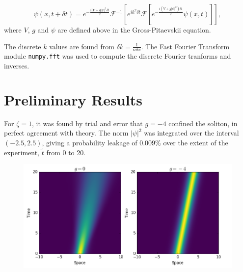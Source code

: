 \documentclass[10pt, twocolumn]{revtex4}    %
\begin{document}
\begin{equation} \label{fft}
\psi(x,t+\delta t) = e^{-\frac{i(V+g|\psi|^2 \delta t}{2}} \mathcal{F}^{-1}[e^{ik^2 \delta t} \mathcal{F} [e^{- \frac{i(V+g|\psi|^2) \delta t}{2}} \psi(x,t) ] ],
\end{equation}
where $V$, $g$ and $\psi$ are defined above in the Gross-Pitaevskii equation. 

The discrete $k$ values are found from $\delta k = \frac{1}{n \delta x}$. The Fast Fourier Transform module \texttt{numpy.fft} was used to compute the discrete Fourier tranforms and inverses. 


\section{Preliminary Results} \label{Milestone}

 For $\zeta=1$, it was found by trial and error that $g=-4$ confined the soliton, in perfect agreement with theory. The norm $|\psi|^2$ was integrated over the interval $(-2.5,2.5)$, giving a probability leakage of 0.009\% over the extent of the experiment, $\tilde{t}$ from 0 to 20. 

\begin{figure}[h]
\includegraphics[width=\columnwidth]{milestonepic.png}
\end{figure}
\end{document}
